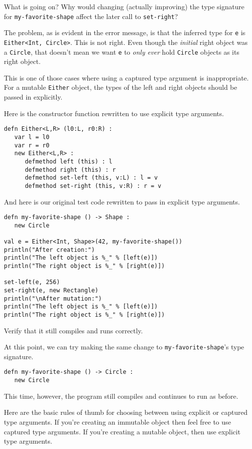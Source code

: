 \documentclass[10pt,oneside]{book}
\begin{document}
What is going on? Why would changing (actually improving) the type signature for \texttt{\frenchspacing my-favorite-shape} affect the later call to \texttt{\frenchspacing set-right}? 

The problem, as is evident in the error message, is that the inferred type for \texttt{\frenchspacing e} is \texttt{\frenchspacing Either<Int, Circle>}. This is not right. Even though the {\em initial} right object was a \texttt{\frenchspacing Circle}, that doesn't mean we want \texttt{\frenchspacing e} to {\em only ever} hold \texttt{\frenchspacing Circle} objects as its right object.

This is one of those cases where using a captured type argument is inappropriate. For a mutable \texttt{\frenchspacing Either} object, the types of the left and right objects should be passed in explicitly.

Here is the constructor function rewritten to use explicit type arguments.
\begin{lstlisting}
defn Either<L,R> (l0:L, r0:R) :
   var l = l0
   var r = r0
   new Either<L,R> :
      defmethod left (this) : l
      defmethod right (this) : r
      defmethod set-left (this, v:L) : l = v
      defmethod set-right (this, v:R) : r = v
\end{lstlisting}
And here is our original test code rewritten to pass in explicit type arguments.
\begin{lstlisting}
defn my-favorite-shape () -> Shape :
   new Circle

val e = Either<Int, Shape>(42, my-favorite-shape())
println("After creation:")
println("The left object is %_" % [left(e)])
println("The right object is %_" % [right(e)])

set-left(e, 256)
set-right(e, new Rectangle)
println("\nAfter mutation:")
println("The left object is %_" % [left(e)])
println("The right object is %_" % [right(e)])
\end{lstlisting}
Verify that it still compiles and runs correctly. 

At this point, we can try making the same change to \texttt{\frenchspacing my-favorite-shape}'s type signature.
\begin{lstlisting}
defn my-favorite-shape () -> Circle :
   new Circle
\end{lstlisting}
This time, however, the program still compiles and continues to run as before. 

Here are the basic rules of thumb for choosing between using explicit or captured type arguments. If you're creating an immutable object then feel free to use captured type arguments. If you're creating a mutable object, then use explicit type arguments. 
\end{document}
